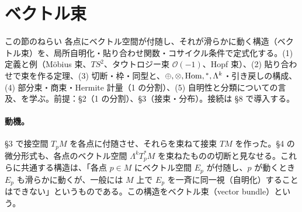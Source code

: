 \setcounter{section}{6}
\providecommand{\Fr}{\operatorname{Fr}}
\providecommand{\gl}{\mathfrak{gl}}
\providecommand{\ug}{\mathfrak{u}}
\providecommand{\sog}{\mathfrak{so}}
\providecommand{\gfr}{\mathfrak g}
\providecommand{\Aut}{\operatorname{Aut}}
\providecommand{\Hol}{\operatorname{Hol}}
\providecommand{\Cinf}{C^\infty}
\providecommand{\KK}{\mathbb K}

\section{ベクトル束}
\label{C:sec7}
\begin{goalbox}{この節のねらい}
各点にベクトル空間が付随し、それが滑らかに動く構造（ベクトル束）を、局所自明化・貼り合わせ関数・コサイクル条件で定式化する。(1) 定義と例（Möbius 束、$TS^2$、タウトロジー束 $\mathcal O(-1)$、Hopf 束）、(2) 貼り合わせで束を作る定理、(3) 切断・枠・同型と、$\oplus,\otimes,\mathrm{Hom},{}^*,\Lambda^k$・引き戻しの構成、(4) 部分束・商束・Hermite 計量（1 の分割）、(5) 自明性と分類についての言及、を学ぶ。前提：§2（1 の分割）、§3（接束・分布）。接続は §8 で導入する。
\end{goalbox}


\paragraph{動機。}§3 で接空間 $T_pM$ を各点に付随させ、それらを束ねて接束 $TM$ を作った。§4 の微分形式も、各点のベクトル空間 $\Lambda^kT_p^*M$ を束ねたものの切断と見なせる。これらに共通する構造は、「各点 $p\in M$ にベクトル空間 $E_p$ が付随し、$p$ が動くとき $E_p$ も滑らかに動くが、一般には $M$ 上で $E_p$ を一斉に同一視（自明化）することはできない」というものである。この構造をベクトル束（vector bundle）という。

